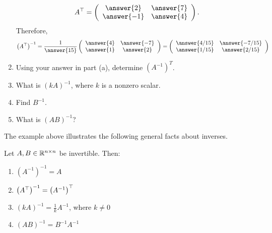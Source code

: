 \documentclass{ximera}
\begin{document}
\begin{example}
\begin{enumerate}
    \begin{prompt}
      \[
        A^\transpose=
        \left(
          \begin{array}{cc}
            \answer{2} &  \answer{7}  \\
            \answer{-1}&  \answer{4}
          \end{array}
        \right).
      \]
      Therefore,
      \[
        \left(A^\transpose\right)^{-1}=
        \frac{1}{\answer{15}}
        \left(
          \begin{array}{cc}
            \answer{4} &  \answer{-7}  \\
            \answer{1}&  \answer{2}
          \end{array}
        \right) =
        \left(
          \begin{array}{cc}
            \answer{4/15} &  \answer{-7/15}  \\
            \answer{1/15}&  \answer{2/15}
          \end{array}
        \right)
      \]
    \end{prompt}
  \item Using your answer in part (a), determine $\left(A^{-1}\right)^{T}$.
  \item What is $(kA)^{-1}$, where $k$ is a nonzero scalar.
  \item Find $B^{-1}$.
  \item What is $(AB)^{-1}$?
  \end{enumerate}
\end{example}

The example above illustrates the following general facts about inverses.

\begin{theorem}
  Let $A, B \in \mathbb{R}^{n \times n}$ be invertible. Then:
  \begin{enumerate}
  \item $\left(A^{-1}\right)^{-1}=A$
  \item $\left(A^\top\right)^{-1}= \left(A^{-1}\right)^\top$
  \item $\left(kA\right)^{-1}= \frac{1}{k}A^{-1}$, where $k \neq 0$
  \item $(AB)^{-1}= B^{-1}A^{-1}$
  \end{enumerate}
\end{theorem}
\end{document}
